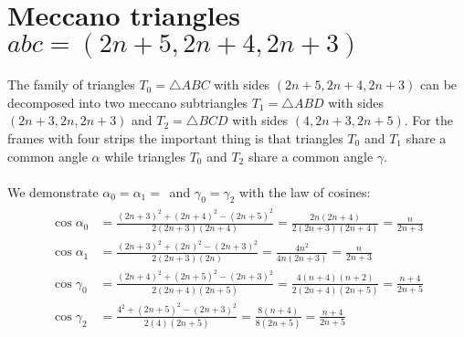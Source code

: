 \documentclass[11pt]{article}
\begin{document}
\section{Meccano triangles $abc=(2n+5,2n+4,2n+3)$}

The family of triangles $T_0=\triangle{ABC}$ with sides $(2n+5,2n+4,2n+3)$ can be decomposed into two meccano subtriangles $T_1 = \triangle{ABD}$ with sides $(2n+3,2n,2n+3)$ and $T_2=\triangle{BCD}$ with sides $(4,2n+3,2n+5)$. For the frames with four strips the important thing is that triangles $T_0$ and $T_1$ share a common angle $\alpha$ while triangles $T_0$ and $T_2$ share a common angle $\gamma$.
\\\\
We demonstrate $\alpha_0 = \alpha_1 = \dfrac{}{}$ and $\gamma_0 = \gamma_2$ with the law of cosines:
\begin{align}
\cos\alpha_0 &= \frac{(2n+3)^2 + (2n+4)^2 - (2n+5)^2}{2(2n+3)(2n+4)}
 = \frac{2n(2n+4)}{2(2n+3)(2n+4)}
 = \frac{n}{2n+3}\\
\cos\alpha_1 &= \frac{(2n+3)^2 + (2n)^2 - (2n+3)^2}{2(2n+3)(2n)}
 = \frac{4n^2}{4n(2n+3)}
 = \frac{n}{2n+3}\\
\cos\gamma_0 &= \frac{(2n+4)^2 + (2n+5)^2 - (2n+3)^2}{2(2n+4)(2n+5)}
 = \frac{4(n+4)(n+2)}{2(2n+4)(2n+5)}
 = \frac{n+4}{2n+5}\\
\cos\gamma_2 &= \frac{4^2 + (2n+5)^2 - (2n+3)^2}{2(4)(2n+5)}
 = \frac{8(n+4)}{8(2n+5)} 
 = \frac{n+4}{2n+5} 
\end{align}

%
\end{document}
